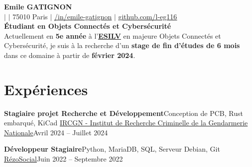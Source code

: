 \documentclass[letterpaper,11pt]{article}
\begin{document}
\begin{center}
  \textbf{\Huge Emile GATIGNON} \\ \vspace{1pt}
  {\phone} $|$ 
  \href{mailto:\email}{\email} $|$ 
  75010 Paris $|$ 
  \href{https://linkedin.com/in/emile-gatignon/}{\underline{/in/emile-gatignon}} $|$
  \href{https://github.com/l-eg16}{\underline{github.com/l-eg116}} \\
  \vspace{6pt}
  \textbf{\small{Étudiant en Objets Connectés et Cybersécurité}} \\
  Actuellement en \textbf{5e année} à l’\href{https://www.esilv.fr/}{\textbf{ESILV}} en majeure Objets Connectés et Cybersécurité, je suis à la recherche d’un \textbf{stage de fin d’études de 6 mois} dans ce domaine à partir de \textbf{février 2024}.
\end{center}

\section{Expériences}
  \resumeSubHeadingListStart
    \resumeSubheading
      {\textbf{Stagiaire projet Recherche et Développement}}{Conception de PCB, Rust embarqué, KiCad}
      {\href{https://www.gendarmerie.interieur.gouv.fr/pjgn/institut-de-recherche-criminelle-de-la-gendarmerie-nationale}{IRCGN - Institut de Recherche Criminelle de la Gendarmerie Nationale}}{Avril 2024 -- Juillet 2024}
      \resumeItemListStart
      \resumeItemListEnd

    \resumeSubheading
      {\textbf{Développeur Stagiaire}}{Python, MariaDB, SQL, Serveur Debian, Git}
      {\href{https://rezosocial.org/}{RézoSocial}}{Juin 2022 -- Septembre 2022}
      \resumeItemListStart
      \resumeItemListEnd
\end{document}
